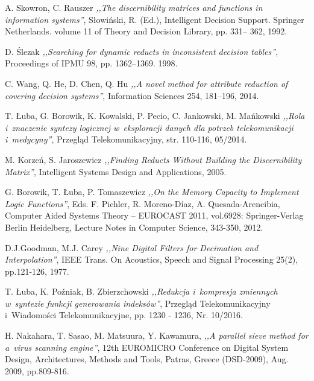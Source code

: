 \begin{thebibliography}{99}
 A. Skowron, C. Rauszer \emph{,,The discernibility matrices and functions in information systems''}, Słowiński, R. (Ed.), Intelligent Decision Support. Springer Netherlands. volume 11 of Theory and Decision Library, pp. 331– 362, 1992.

 D. Ślezak \emph{,,Searching for dynamic reducts in inconsistent decision tables''}, Proceedings of IPMU 98, pp. 1362–1369. 1998.

 C. Wang, Q. He, D. Chen, Q. Hu \emph{,,A novel method for attribute reduction of covering decision systems''}, Information Sciences 254, 181–196, 2014.

 T. Łuba, G. Borowik, K. Kowalski, P. Pecio, C. Jankowski, M. Mańkowski \emph{,,Rola i~znaczenie syntezy logicznej w~eksploracji danych dla potrzeb telekomunikacji i~medycyny''}, Przegląd Telekomunikacyjny, str. 110-116, 05/2014.

 M. Korzeń, S. Jaroszewicz \emph{,,Finding Reducts Without Building the Discernibility Matrix''}, Intelligent Systems Design and Applications, 2005.

 G. Borowik, T. Łuba, P. Tomaszewicz \emph{,,On the Memory Capacity to Implement Logic Functions''}, Eds. F. Pichler, R. Moreno-Díaz, A. Quesada-Arencibia, Computer Aided Systems Theory – EUROCAST 2011, vol.6928: Springer-Verlag Berlin Heidelberg, Lecture Notes in Computer Science, 343-350, 2012.

 D.J.Goodman, M.J. Carey \emph{,,Nine Digital Filters for Decimation and Interpolation''}, IEEE Trans. On Acoustics, Speech and Signal Processing 25(2), pp.121-126, 1977.

 T. Łuba, K. Poźniak, B. Zbierzchowski \emph{,,Redukcja i~kompresja zmiennych w~syntezie funkcji generowania indeksów''}, Przegląd Telekomunikacyjny i~Wiadomości Telekomunikacyjne, pp. 1230 - 1236, Nr. 10/2016.

 H. Nakahara, T. Sasao, M. Matsuura, Y. Kawamura, \emph{,,A parallel sieve method for a~virus scanning engine''}, 12th EUROMICRO Conference on Digital System Design, Architectures, Methods and Tools, Patras, Greece (DSD-2009), Aug. 2009, pp.809-816.

\end{thebibliography}
\clearpage




